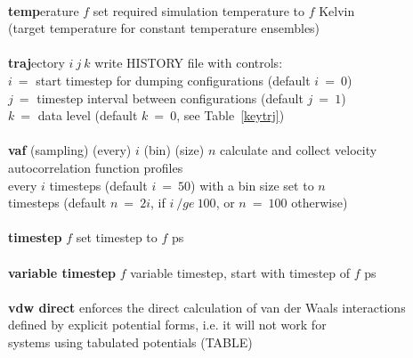 \begin{tabbing}
\>                                              \> \\
\> {\bf temp}erature $f$                        \> set required simulation temperature to $f$ Kelvin \\
\>                                              \> (target temperature for constant temperature ensembles) \\
\>                                              \> \\
\> {\bf traj}ectory $i~j~k$                     \> write HISTORY file with controls: \\
\>                                              \> $i~=$ start timestep for dumping configurations (default $i~=~0$) \\
\>                                              \> $j~=$ timestep interval between configurations (default $j~=~1$) \\
\>                                              \> $k~=$ data level (default $k~=~0$, see Table~\ref{keytrj}) \\
\>                                              \> \\
\> {\bf vaf} (sampling) (every) $i$ (bin) (size) $n$ \> \phantom{xxxx} calculate and collect velocity autocorrelation function profiles \\
\>                                                   \> \phantom{xxxx} every $i$ timesteps (default $i~=~50$) with a bin size set to $n$ \\
\>                                                   \> \phantom{xxxx} timesteps (default $n~=~2i$, if $i~/ge~100$, or $n~=~100$ otherwise) \\
\>                                              \> \\
\> {\bf timestep} $f$                           \> set timestep to $f$ ps \\
\>                                              \> \\
\> {\bf variable timestep} $f$                  \> variable timestep, start with timestep of $f$ ps \\
\>                                              \> \\
\> {\bf vdw direct}                             \> enforces the direct calculation of van der Waals interactions \\
\>                                              \> defined by explicit potential forms, i.e. it will not work for \\
\>                                              \> systems using tabulated potentials (TABLE) \\

\end{tabbing}
